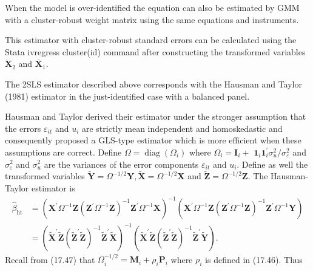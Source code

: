 \documentclass[10pt]{article}
\begin{document}
When the model is over-identified the equation can also be estimated by GMM with a cluster-robust weight matrix using the same equations and instruments.

This estimator with cluster-robust standard errors can be calculated using the Stata ivregress cluster(id) command after constructing the transformed variables $\dot{\boldsymbol{X}}_{2}$ and $\overline{\boldsymbol{X}}_{1}$.

The 2SLS estimator described above corresponds with the Hausman and Taylor (1981) estimator in the just-identified case with a balanced panel.

Hausman and Taylor derived their estimator under the stronger assumption that the errors $\varepsilon_{i t}$ and $u_{i}$ are strictly mean independent and homoskedastic and consequently proposed a GLS-type estimator which is more efficient when these assumptions are correct. Define $\Omega=\operatorname{diag}\left(\Omega_{i}\right)$ where $\Omega_{i}=\boldsymbol{I}_{i}+$ $\mathbf{1}_{i} \mathbf{1}_{i}^{\prime} \sigma_{u}^{2} / \sigma_{\varepsilon}^{2}$ and $\sigma_{\varepsilon}^{2}$ and $\sigma_{u}^{2}$ are the variances of the error components $\varepsilon_{i t}$ and $u_{i}$. Define as well the transformed variables $\widetilde{\boldsymbol{Y}}=\Omega^{-1 / 2} \boldsymbol{Y}, \widetilde{\boldsymbol{X}}=\Omega^{-1 / 2} \boldsymbol{X}$ and $\widetilde{\boldsymbol{Z}}=\Omega^{-1 / 2} \boldsymbol{Z}$. The Hausman-Taylor estimator is
$$
\begin{aligned}
\widehat{\beta}_{\mathrm{ht}} &=\left(\boldsymbol{X}^{\prime} \Omega^{-1} \boldsymbol{Z}\left(\boldsymbol{Z}^{\prime} \Omega^{-1} \boldsymbol{Z}\right)^{-1} \boldsymbol{Z}^{\prime} \Omega^{-1} \boldsymbol{X}\right)^{-1}\left(\boldsymbol{X}^{\prime} \Omega^{-1} \boldsymbol{Z}\left(\boldsymbol{Z}^{\prime} \Omega^{-1} \boldsymbol{Z}\right)^{-1} \boldsymbol{Z}^{\prime} \Omega^{-1} \boldsymbol{Y}\right) \\
&=\left(\widetilde{\boldsymbol{X}}^{\prime} \widetilde{\boldsymbol{Z}}\left(\widetilde{\boldsymbol{Z}}^{\prime} \widetilde{\boldsymbol{Z}}\right)^{-1} \widetilde{\boldsymbol{Z}}^{\prime} \widetilde{\boldsymbol{X}}\right)^{-1}\left(\widetilde{\boldsymbol{X}}^{\prime} \widetilde{\boldsymbol{Z}}\left(\widetilde{\boldsymbol{Z}}^{\prime} \widetilde{\boldsymbol{Z}}\right)^{-1} \widetilde{\boldsymbol{Z}}^{\prime} \widetilde{\boldsymbol{Y}}\right) .
\end{aligned}
$$
Recall from (17.47) that $\Omega_{i}^{-1 / 2}=\boldsymbol{M}_{i}+\rho_{i} \boldsymbol{P}_{i}$ where $\rho_{i}$ is defined in (17.46). Thus
\end{document}
